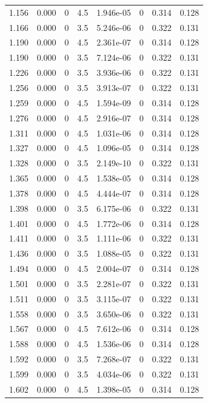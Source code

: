 \documentclass[preview]{standalone}
\begin{document}
{{{\begin{tabular}{L{1.2cm}C{1.2cm} C{0.3cm}C{0.5cm} C{1.4cm}C{1.4cm} C{1.4cm}C{1.4cm}}
  1.156  &  0.000  & 0     & 4.5 &  1.946e-05  & 0  & 0.314 &  0.128   \\ 
  1.166  &  0.000  & 0     & 3.5 &  5.246e-06  & 0  & 0.322 &  0.131   \\ 
  1.190  &  0.000  & 0     & 4.5 &  2.361e-07  & 0  & 0.314 &  0.128   \\ 
  1.190  &  0.000  & 0     & 3.5 &  7.124e-06  & 0  & 0.322 &  0.131   \\ 
  1.226  &  0.000  & 0     & 3.5 &  3.936e-06  & 0  & 0.322 &  0.131   \\ 
  1.256  &  0.000  & 0     & 3.5 &  3.913e-07  & 0  & 0.322 &  0.131   \\ 
  1.259  &  0.000  & 0     & 4.5 &  1.594e-09  & 0  & 0.314 &  0.128   \\ 
  1.276  &  0.000  & 0     & 4.5 &  2.916e-07  & 0  & 0.314 &  0.128   \\ 
  1.311  &  0.000  & 0     & 4.5 &  1.031e-06  & 0  & 0.314 &  0.128   \\ 
  1.327  &  0.000  & 0     & 4.5 &  1.096e-05  & 0  & 0.314 &  0.128   \\ 
  1.328  &  0.000  & 0     & 3.5 &  2.149e-10  & 0  & 0.322 &  0.131   \\ 
  1.365  &  0.000  & 0     & 4.5 &  1.538e-05  & 0  & 0.314 &  0.128   \\ 
  1.378  &  0.000  & 0     & 4.5 &  4.444e-07  & 0  & 0.314 &  0.128   \\ 
  1.398  &  0.000  & 0     & 3.5 &  6.175e-06  & 0  & 0.322 &  0.131   \\ 
  1.401  &  0.000  & 0     & 4.5 &  1.772e-06  & 0  & 0.314 &  0.128   \\ 
  1.411  &  0.000  & 0     & 3.5 &  1.111e-06  & 0  & 0.322 &  0.131   \\ 
  1.436  &  0.000  & 0     & 3.5 &  1.088e-05  & 0  & 0.322 &  0.131   \\ 
  1.494  &  0.000  & 0     & 4.5 &  2.004e-07  & 0  & 0.314 &  0.128   \\ 
  1.501  &  0.000  & 0     & 3.5 &  2.281e-07  & 0  & 0.322 &  0.131   \\ 
  1.511  &  0.000  & 0     & 3.5 &  3.115e-07  & 0  & 0.322 &  0.131   \\ 
  1.558  &  0.000  & 0     & 3.5 &  3.650e-06  & 0  & 0.322 &  0.131   \\ 
  1.567  &  0.000  & 0     & 4.5 &  7.612e-06  & 0  & 0.314 &  0.128   \\ 
  1.588  &  0.000  & 0     & 4.5 &  1.536e-06  & 0  & 0.314 &  0.128   \\ 
  1.592  &  0.000  & 0     & 3.5 &  7.268e-07  & 0  & 0.322 &  0.131   \\ 
  1.599  &  0.000  & 0     & 3.5 &  4.034e-06  & 0  & 0.322 &  0.131   \\ 
  1.602  &  0.000  & 0     & 4.5 &  1.398e-05  & 0  & 0.314 &  0.128   \\ 
\hline 
\end{tabular} 

}}}
\end{document}
